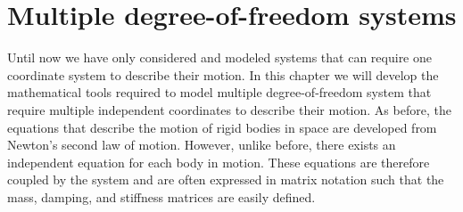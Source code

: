 \documentclass[12pt,letter]{article}
\numberwithin{ex}{section} %
\numberwithin{re}{section} %
\begin{document}
\setcounter{section}{4}	
\section{Multiple degree-of-freedom systems}

Until now we have only considered and modeled systems that can require one coordinate system to describe their motion. In this chapter we will develop the mathematical tools required to model multiple degree-of-freedom system that require multiple independent coordinates to describe their motion. As before, the equations that describe the motion of rigid bodies in space are developed from Newton's second law of motion. However, unlike before, there exists an independent equation for each body in motion. These equations are therefore coupled by the system and are often expressed in matrix notation such that the mass, damping, and stiffness matrices are easily defined. 
\end{document}
